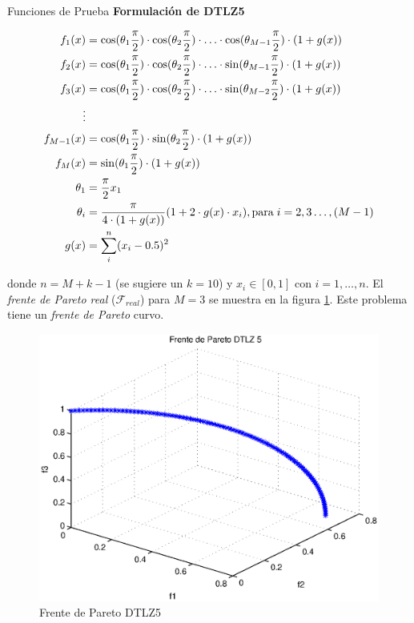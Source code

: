 \begin{chapter}{Funciones de Prueba}
\textbf{Formulaci\'on de DTLZ5}

\begin{align*}
f_1(x)&=\cos(\theta_1\frac{\pi}{2})\cdot\cos(\theta_2\frac{\pi}{2})\cdot\ldots\cdot \cos(\theta_{M-1}\frac{\pi}{2})\cdot(1+g(x))\\
f_2(x)&=\cos(\theta_1\frac{\pi}{2})\cdot\cos(\theta_2\frac{\pi}{2})\cdot\ldots\cdot \sin(\theta_{M-1}\frac{\pi}{2})\cdot(1+g(x))\\
f_3(x)&=\cos(\theta_1\frac{\pi}{2})\cdot\cos(\theta_2\frac{\pi}{2})\cdot\ldots\cdot \sin(\theta_{M-2}\frac{\pi}{2})\cdot(1+g(x))\\
\vdots&\\
f_{M-1}(x)&=\cos(\theta_1\frac{\pi}{2})\cdot\sin(\theta_2\frac{\pi}{2})\cdot(1+g(x))\\
f_{M}(x)&=\sin(\theta_1\frac{\pi}{2})\cdot(1+g(x))\\
\theta_1&=\frac{\pi}{2}x_1\\
\theta_i&=\frac{\pi}{4\cdot(1+g(x))}(1+2\cdot g(x)\cdot x_i),  \text{para} \hspace{1mm} i=2,3\dots,(M-1)\\
g(x)&=\sum^n_i(x_i-0.5)^2
\end{align*}

donde $n=M+k-1$ (se sugiere un $k=10$) y $x_i\in[0,1]$ con $i = 1,\ldots,n$. El \textit{frente de Pareto real} ($\mathcal{F}_{real}$) 
para $M=3$ se muestra en la figura \ref{fig:DTLZ5}. Este problema tiene un {\it frente de Pareto} curvo.

\begin{figure}[h!]
 \centering
\includegraphics[scale=0.4]{ApendiceA/paretoDTLZ5.eps}
\caption{Frente de Pareto DTLZ5}
\label{fig:DTLZ5}
\end{figure}


\end{chapter}
